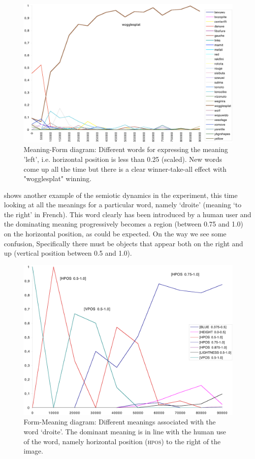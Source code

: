 \begin{figure}[htbp]
  \centerline{\includegraphics[width=\textwidth]{chap8/figures/wogglesplat.pdf}}
\caption{\label{fig:woggle}Meaning-Form diagram: Different words for expressing the meaning 'left', i.e. 
horizontal position is less than 0.25 (scaled). 
New words come up all the time but there is a clear winner-take-all effect with "wogglesplat" winning. 
}
\end{figure}

 shows another example of the semiotic dynamics in the experiment, this time looking at all the 
meanings for a particular word, namely `droite' (meaning `to the right' in French). This word clearly has been introduced
by a human user and the dominating meaning progressively becomes a region (between 0.75 and 1.0) on the horizontal position, 
as could be expected. On the way we see some confusion, Specifically there must be objects that appear both on the right 
and up (vertical position between 0.5 and 1.0). 

\begin{figure}[htbp]
  \centerline{\includegraphics[width=\textwidth]{chap8/figures/droite.pdf}}
\caption{\label{fig:droite}Form-Meaning diagram: Different meanings associated with the word `droite'. The dominant meaning is 
in line with the human use of the word, namely horizontal position (\textsc{hpos}) to the right of the image.}
\end{figure}

